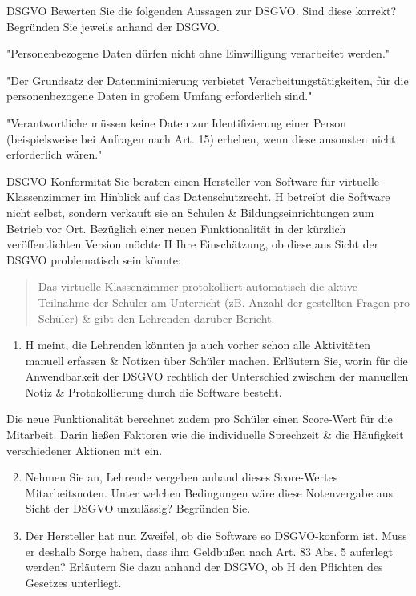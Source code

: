 \documentclass{exercisesheet}
\begin{document}
\begin{eexercises}{DSGVO}{
    Bewerten Sie die folgenden Aussagen zur DSGVO. Sind diese korrekt? Begründen Sie jeweils anhand der DSGVO.
  }
  \item "Personenbezogene Daten dürfen nicht ohne Einwilligung verarbeitet werden."
  \item "Der Grundsatz der Datenminimierung verbietet Verarbeitungstätigkeiten, für die personenbezogene Daten in großem Umfang erforderlich sind."
  \item "Verantwortliche müssen keine Daten zur Identifizierung einer Person (beispielsweise bei Anfragen nach Art. 15) erheben, wenn diese ansonsten nicht erforderlich wären."
\end{eexercises}

\begin{exercise}{DSGVO Konformität}
  Sie beraten einen Hersteller von Software für virtuelle Klassenzimmer im Hinblick auf das Datenschutzrecht. H betreibt die Software nicht selbst, sondern verkauft sie an Schulen \& Bildungseinrichtungen zum Betrieb vor Ort. Bezüglich einer neuen Funktionalität in der kürzlich veröffentlichten Version möchte H Ihre Einschätzung, ob diese aus Sicht der DSGVO problematisch sein könnte:
  \begin{quote}
    Das virtuelle Klassenzimmer protokolliert automatisch die aktive Teilnahme der Schüler am Unterricht (zB. Anzahl der gestellten Fragen pro Schüler) \& gibt den Lehrenden darüber Bericht.
  \end{quote}

  \begin{enumerate}
    \item H meint, die Lehrenden könnten ja auch vorher schon alle Aktivitäten manuell erfassen \& Notizen über Schüler machen. Erläutern Sie, worin für die Anwendbarkeit der DSGVO rechtlich der Unterschied zwischen der manuellen Notiz \& Protokollierung durch die Software besteht.
  \end{enumerate}

  Die neue Funktionalität berechnet zudem pro Schüler einen Score-Wert für die Mitarbeit. Darin ließen Faktoren wie die individuelle Sprechzeit \& die Häufigkeit verschiedener Aktionen mit ein.

  \begin{enumerate}
    \setcounter{enumi}{1}
    \item Nehmen Sie an, Lehrende vergeben anhand dieses Score-Wertes Mitarbeitsnoten. Unter welchen Bedingungen wäre diese Notenvergabe aus Sicht der DSGVO unzulässig? Begründen Sie.
    \item Der Hersteller hat nun Zweifel, ob die Software so DSGVO-konform ist. Muss er deshalb Sorge haben, dass ihm Geldbußen nach Art. 83 Abs. 5 auferlegt werden? Erläutern Sie dazu anhand der DSGVO, ob H den Pflichten des Gesetzes unterliegt.
  \end{enumerate}
\end{exercise}
\end{document}
